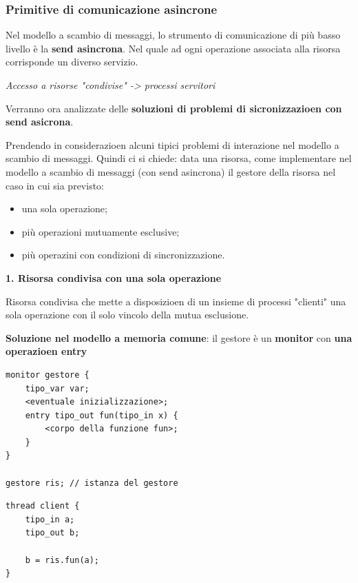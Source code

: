 \documentclass{article}
\begin{document}
\subsubsection{Primitive di comunicazione asincrone}

Nel modello a scambio di messaggi, lo strumento di comunicazione di più basso livello è la \textbf{send asincrona}. Nel quale ad ogni operazione associata alla risorsa corrisponde
un diverso servizio.

\vspace{3mm}
\textit{Accesso a risorse "condivise" -> processi servitori}

\vspace{3mm}

Verranno ora analizzate delle \textbf{soluzioni di problemi di sicronizzazioen con send asicrona}.

Prendendo in considerazioen alcuni tipici problemi di interazione nel modello a scambio di messaggi. Quindi ci si chiede: data una risorsa, come implementare nel modello a scambio
di messaggi (con send asincrona) il gestore della risorsa nel caso in cui sia previsto:
\begin{itemize}
    \item una sola operazione;
    \item più operazioni mutuamente esclusive;
    \item più operazini con condizioni di sincronizzazione.
\end{itemize}

\vspace{5mm}
{\large \textbf{1. Risorsa condivisa con una sola operazione}}

\vspace{3mm}
Risorsa condivisa che mette a disposizioen di un insieme di processi "clienti" una sola operazione con il solo vincolo della mutua esclusione.

\vspace{3mm}
\textbf{Soluzione nel modello a memoria comune}: il gestore è un \textbf{monitor} con \textbf{una operazioen entry}

\noindent
\begin{minipage}{.45\columnwidth}
\begin{lstlisting}
monitor gestore {
    tipo_var var;
    <eventuale inizializzazione>;
    entry tipo_out fun(tipo_in x) {
        <corpo della funzione fun>;
    }
}

gestore ris; // istanza del gestore
\end{lstlisting}
\end{minipage}\hfill
\begin{minipage}{.45\columnwidth}
\begin{lstlisting}
thread client {
    tipo_in a;
    tipo_out b;

    b = ris.fun(a);
}
\end{lstlisting}
\end{minipage}
\end{document}
